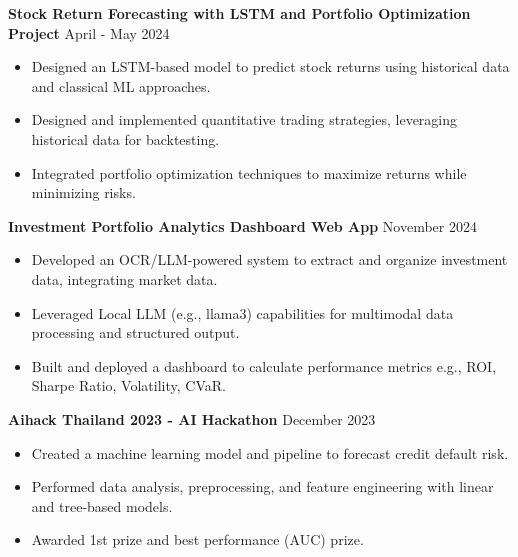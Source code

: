 \documentclass[a4paper, 11pt]{article}
\begin{document}
\textbf{Stock Return Forecasting with LSTM and Portfolio Optimization Project} \hfill April - May 2024
\begin{itemize}[noitemsep, topsep=0pt, partopsep=0pt, parsep=0pt]
    \item Designed an LSTM-based model to predict stock returns using historical data and classical ML approaches.
    \item Designed and implemented quantitative trading strategies, leveraging historical data for backtesting.
    \item Integrated portfolio optimization techniques to maximize returns while minimizing risks.
\end{itemize}

\vspace{3pt}

\textbf{Investment Portfolio Analytics Dashboard Web App} \hfill November 2024
\begin{itemize}[noitemsep, topsep=0pt, partopsep=0pt, parsep=0pt]
    \item Developed an OCR/LLM-powered system to extract and organize investment data, integrating market data.
    \item Leveraged Local LLM (e.g., llama3) capabilities for multimodal data processing and structured output.
    \item Built and deployed a dashboard to calculate performance metrics e.g., ROI, Sharpe Ratio, Volatility, CVaR.
\end{itemize}

\vspace{3pt}

\textbf{Aihack Thailand 2023 - AI Hackathon} \hfill December 2023
\begin{itemize}[noitemsep, topsep=0pt, partopsep=0pt, parsep=0pt]
    \item Created a machine learning model and pipeline to forecast credit default risk.
    \item Performed data analysis, preprocessing, and feature engineering with linear and tree-based models.
    \item Awarded 1st prize and best performance (AUC) prize.
\end{itemize}

\vspace{3pt}
\end{document}

